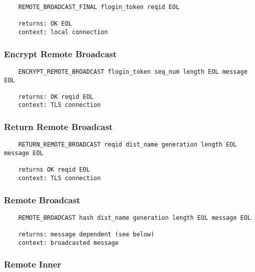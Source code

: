 \documentclass[letterpaper,11pt,oneside]{article}
\begin{document}
\vspace{10pt}
\begin{verbatim}
    REMOTE_BROADCAST_FINAL flogin_token reqid EOL 

    returns: OK EOL
    context: local connection
\end{verbatim}
\vspace{10pt}

\subsubsection{Encrypt Remote Broadcast}

\vspace{10pt}
\begin{verbatim}
    ENCRYPT_REMOTE_BROADCAST flogin_token seq_num length EOL message EOL

    returns: OK reqid EOL
    context: TLS connection
\end{verbatim}
\vspace{10pt}

\subsubsection{Return Remote Broadcast}

\vspace{10pt}
\begin{verbatim}
    RETURN_REMOTE_BROADCAST reqid dist_name generation length EOL message EOL

    returns OK reqid EOL
    context: TLS connection
\end{verbatim}
\vspace{10pt}

\subsubsection{Remote Broadcast}

\vspace{10pt}
\begin{verbatim}
    REMOTE_BROADCAST hash dist_name generation length EOL message EOL

    returns: message dependent (see below)
    context: broadcasted message
\end{verbatim}
\vspace{10pt}

\subsubsection{Remote Inner}
\end{document}
